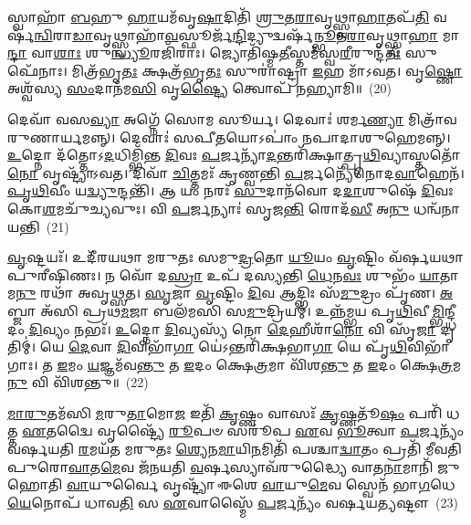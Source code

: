 𑌸𑍍𑌵𑌾𑌹𑌾᳴ \ul{𑌬}\-𑌹𑍁 \ul{𑌹𑌾}\-𑌯𑌮᳴𑌵𑍃\-\ul{𑌷𑌾}\-𑌦𑌿𑌤𑌿᳴ \ul{𑌶𑍍𑌰𑍁}\-𑌤\-\ul{𑌰𑌾}\-𑌵𑍃𑌥𑍍𑌸𑍍𑌵𑌾\-\ul{𑌹𑌾}\-𑌤𑌪᳴\-\ul{𑌤𑌿} 𑌵𑌰𑍍\mbox{}𑌷᳴\-\ul{𑌨𑍍𑌵𑌿}\-𑌰𑌾\-\ul{𑌡𑌾}\-𑌵𑍃𑌥𑍍𑌸𑍍𑌵𑌾𑌹𑌾᳴\-\ul{𑌵}\-𑌸𑍍𑌫𑍂𑌰𑍍𑌜᳴\-\ul{𑌨𑍍𑌦𑌿}\-𑌦𑍍𑌯𑍁𑌦𑍍𑌵𑌰𑍍\mbox{}𑌷᳴\-\ul{𑌨𑍍𑌭𑍂}\-𑌤\-\ul{𑌰𑌾}\-𑌵𑍃𑌥𑍍𑌸𑍍𑌵𑌾\-\ul{𑌹𑌾} 𑌮𑌾\-\ul{𑌨𑍍𑌦𑌾} 𑌵𑌾\-\ul{𑌶𑌾𑌃} 𑌶𑍁\-\ul{𑌨𑍍𑌧𑍍𑌯𑍂}\-𑌰𑌜𑌿᳴𑌰𑌾𑌃। 𑌜𑍍𑌯𑍋𑌤𑌿᳴𑌷𑍍𑌮\-\ul{𑌤𑍀}\-𑌸𑍍𑌤𑌮᳴𑌸𑍍𑌵\-\ul{𑌰𑍀}\-𑌰𑍁𑌨𑍍𑌦᳴\-\ul{𑌤𑍀𑌃} 𑌸𑍁𑌫𑍇᳴𑌨𑌾𑌃। 𑌮𑌿𑌤𑍍𑌰᳴𑌭𑍃\-\ul{𑌤𑌃} 𑌕𑍍𑌷𑌤𑍍𑌰᳴𑌭𑍃\-\ul{𑌤𑌃} 𑌸𑍁𑌰𑌾॑𑌷𑍍𑌟𑍍𑌰𑌾 \ul{𑌇}\-𑌹 𑌮𑌾᳴\-𑌽𑌵𑌤। 𑌵𑍃\-\ul{𑌷𑍍𑌣𑍋} 𑌅𑌶𑍍𑌵᳴𑌸𑍍𑌯 \ul{𑌸𑌂}\-𑌦𑌾𑌨᳴𑌮\-\ul{𑌸𑌿} 𑌵𑍃\-\ul{𑌷𑍍𑌟𑍍𑌯𑍈} 𑌤𑍍𑌵𑍋𑌪᳴ 𑌨𑌹𑍍𑌯𑌾𑌮𑌿॥~(20)

{\anuvakamend[{\-\ul{𑌪𑍂}\-𑌰𑍍𑌤𑌿\-\ul{𑌰𑌾}\-𑌵𑍃𑌦𑍍𑌦𑍍𑌵𑌿𑌚᳴𑌤𑍍𑌵𑌾𑌰𑌿𑍞𑌶𑌚𑍍𑌚}]}%

𑌦𑍇𑌵𑌾᳴ 𑌵𑌸\-\ul{𑌵𑍍𑌯𑌾} 𑌅𑌗𑍍𑌨𑍇᳴ 𑌸𑍋𑌮 𑌸𑍂𑌰𑍍𑌯। 𑌦𑍇𑌵𑌾𑌃॑ 𑌶𑌰𑍍𑌮\-\ul{𑌣𑍍𑌯𑌾} 𑌮𑌿𑌤𑍍𑌰𑌾᳴𑌵𑌰𑍁𑌣𑌾𑌰𑍍𑌯𑌮𑌨𑍍𑌨𑍍। 𑌦𑍇𑌵𑌾𑌃॑ 𑌸𑌪𑍀\-\ul{𑌤}\-𑌯𑍋\-𑌽𑌪𑌾𑌂॑ 𑌨𑌪𑌾𑌦𑌾𑌶𑍁𑌹𑍇𑌮𑌨𑍍𑌨𑍍। \ul{𑌉}\-𑌦𑍍𑌨𑍋 𑌦᳴𑌤𑍍𑌤𑍋\-𑌽\-\ul{𑌦}\-𑌧𑌿𑌮𑍍𑌭𑌿᳴𑌨𑍍𑌤 \ul{𑌦𑌿}\-𑌵𑌃 \ul{𑌪}\-𑌰𑍍𑌜𑌨𑍍𑌯𑌾᳴\-\ul{𑌦}\-𑌨𑍍𑌤𑌰𑌿᳴𑌕𑍍𑌷𑌾𑌤𑍍𑌪𑍃\-\ul{𑌥𑌿}\-𑌵𑍍𑌯𑌾𑌸𑍍𑌤𑌤𑍋᳴ \ul{𑌨𑍋} 𑌵𑍃𑌷𑍍𑌟𑍍𑌯𑌾᳴\-𑌽𑌵𑌤। 𑌦𑌿𑌵𑌾᳴ \ul{𑌚𑌿}\-𑌤𑍍𑌤𑌮𑌃᳴ 𑌕𑍃𑌣𑍍𑌵𑌨𑍍𑌤𑌿 \ul{𑌪}\-𑌰𑍍𑌜𑌨𑍍𑌯𑍇᳴𑌨𑍋𑌦\-\ul{𑌵𑌾}\-𑌹𑍇𑌨᳴। \ul{𑌪𑍃}\-\-\ul{𑌥𑌿}\-𑌵𑍀𑌂 𑌯\-\ul{𑌦𑍍𑌵𑍍𑌯𑍁}\-𑌨𑍍𑌦𑌨𑍍𑌤𑌿᳴। 𑌆 𑌯𑌂 𑌨𑌰𑌃᳴ \ul{𑌸𑍁}\-𑌦𑌾𑌨᳴𑌵𑍋 𑌦\-\ul{𑌦𑌾}\-𑌶𑍁𑌷𑍇᳴ \ul{𑌦𑌿}\-𑌵𑌃 𑌕𑍋\-\ul{𑌶}\-𑌮𑌚𑍁᳴𑌚𑍍𑌯𑌵𑍁𑌃। 𑌵𑌿 \ul{𑌪}\-𑌰𑍍𑌜𑌨𑍍𑌯𑌾𑌃॑ 𑌸𑍃𑌜\-\ul{𑌨𑍍𑌤𑌿} 𑌰𑍋𑌦᳴\-\ul{𑌸𑍀} 𑌅\-\ul{𑌨𑍁} 𑌧𑌨𑍍𑌵᳴𑌨𑌾 𑌯𑌨𑍍𑌤𑌿~(21)

\-\ul{𑌵𑍃}\-𑌷𑍍𑌟𑌯𑌃᳴। 𑌉𑌦𑍀᳴𑌰𑌯𑌥𑌾 𑌮𑌰𑍁𑌤𑌃 𑌸𑌮𑍁\-\ul{𑌦𑍍𑌰}\-𑌤𑍋 \ul{𑌯𑍂}\-𑌯𑌂 \ul{𑌵𑍃}\-𑌷𑍍𑌟𑌿𑌂 𑌵᳴𑌰𑍍\mbox{}𑌷𑌯𑌥𑌾 𑌪𑍁𑌰𑍀𑌷𑌿𑌣𑌃। 𑌨 𑌵𑍋᳴ 𑌦\-\ul{𑌸𑍍𑌰𑌾} 𑌉𑌪᳴ 𑌦𑌸𑍍𑌯𑌨𑍍𑌤𑌿 \ul{𑌧𑍇}\-𑌨\-\ul{𑌵𑌃} 𑌶𑍁𑌭𑌂᳴ \ul{𑌯𑌾}\-𑌤𑌾𑌮\-\ul{𑌨𑍁} 𑌰𑌥𑌾᳴ 𑌅𑌵𑍃𑌥𑍍𑌸𑌤। \ul{𑌸𑍃}\-𑌜𑌾 \ul{𑌵𑍃}\-𑌷𑍍𑌟𑌿𑌂 \ul{𑌦𑌿}\-𑌵 𑌆𑌦𑍍𑌭𑌿𑌃 𑌸᳴\-\ul{𑌮𑍁}\-𑌦𑍍𑌰𑌂 𑌪𑍃᳴𑌣। \ul{𑌅}\-𑌬𑍍𑌜𑌾 𑌅᳴𑌸𑌿 𑌪𑍍𑌰𑌥\-\ul{𑌮}\-𑌜𑌾 𑌬𑌲᳴𑌮𑌸𑌿 𑌸\-\ul{𑌮𑍁}\-𑌦𑍍𑌰𑌿𑌯𑌮𑍍॑। 𑌉𑌨𑍍𑌨᳴𑌮𑍍𑌭𑌯 𑌪𑍃\-\ul{𑌥𑌿}\-𑌵𑍀\-\ul{𑌮𑍍𑌭𑌿}\-𑌨𑍍𑌦𑍍𑌧𑍀𑌦𑌂 \ul{𑌦𑌿}\-𑌵𑍍𑌯𑌂 𑌨𑌭𑌃᳴। \ul{𑌉}\-𑌦𑍍𑌨𑍋 \ul{𑌦𑌿}\-𑌵𑍍𑌯𑌸𑍍𑌯᳴ 𑌨𑍋 \ul{𑌦𑍇}\-𑌹𑍀𑌶𑌾᳴\-\ul{𑌨𑍋} 𑌵𑌿 𑌸𑍃᳴\-\ul{𑌜𑌾} 𑌦𑍃𑌤𑌿𑌮𑍍॑। 𑌯𑍇 \ul{𑌦𑍇}\-𑌵𑌾 \ul{𑌦𑌿}\-𑌵𑌿𑌭𑌾᳴\-\ul{𑌗𑌾} 𑌯𑍇॑\-𑌽𑌨𑍍𑌤𑌰𑌿᳴𑌕𑍍𑌷𑌭𑌾\-\ul{𑌗𑌾} 𑌯𑍇 𑌪𑍃᳴\-\ul{𑌥𑌿}\-𑌵𑌿𑌭𑌾᳴𑌗𑌾𑌃। 𑌤 \ul{𑌇}\-𑌮𑌂 \ul{𑌯}\-𑌜𑍍𑌞𑌮᳴𑌵\-\ul{𑌨𑍍𑌤𑍁} 𑌤 \ul{𑌇}\-𑌦𑌂 𑌕𑍍𑌷𑍇\-\ul{𑌤𑍍𑌰}\-𑌮𑌾 𑌵𑌿᳴𑌶\-\ul{𑌨𑍍𑌤𑍁} 𑌤 \ul{𑌇}\-𑌦𑌂 𑌕𑍍𑌷𑍇\-\ul{𑌤𑍍𑌰}\-𑌮\-\ul{𑌨𑍁} 𑌵𑌿 𑌵𑌿᳴𑌶𑌨𑍍𑌤𑍁॥~(22)

{\anuvakamend[{\-\ul{𑌯}\-\-\ul{𑌨𑍍𑌤𑌿} \ul{𑌦𑍇}\-𑌵𑌾 𑌵𑌿𑍞᳴𑌶\-\ul{𑌤𑌿}\-𑌶𑍍𑌚᳴}]}%

\-\ul{𑌮𑌾}\-\-\ul{𑌰𑍁}\-𑌤𑌮᳴𑌸𑌿 \ul{𑌮}\-𑌰𑍁\-\ul{𑌤𑌾}\-𑌮𑍋\-\ul{𑌜} 𑌇𑌤𑌿᳴ \ul{𑌕𑍃}\-𑌷𑍍𑌣𑌂 𑌵𑌾𑌸𑌃᳴ \ul{𑌕𑍃}\-𑌷𑍍𑌣𑌤𑍂᳴\-\ul{𑌷𑌂} 𑌪𑌰𑌿᳴ 𑌧𑌤𑍍𑌤 \ul{𑌏}\-𑌤𑌦𑍍𑌵𑍈 𑌵𑍃𑌷𑍍𑌟𑍍𑌯𑍈᳴ \ul{𑌰𑍂}\-𑌪𑍞 𑌸𑌰𑍂᳴𑌪 \ul{𑌏}\-𑌵 \ul{𑌭𑍂}\-𑌤𑍍𑌵𑌾 \ul{𑌪}\-𑌰𑍍𑌜𑌨𑍍𑌯𑌂᳴ 𑌵𑌰𑍍\mbox{}𑌷𑌯𑌤𑌿 \ul{𑌰}\-𑌮𑌯᳴𑌤 𑌮𑌰𑍁𑌤𑌃 \ul{𑌶𑍍𑌯𑍇}\-𑌨\-\ul{𑌮𑌾}\-𑌯𑌿\-\ul{𑌨}\-𑌮𑌿𑌤𑌿᳴ 𑌪𑌶𑍍𑌚𑌾\-\ul{𑌦𑍍𑌵𑌾}\-𑌤𑌂 𑌪𑍍𑌰𑌤𑌿᳴ 𑌮𑍀𑌵𑌤𑌿 𑌪𑍁𑌰𑍋\-\ul{𑌵𑌾}\-𑌤\-\ul{𑌮𑍇}\-𑌵 𑌜᳴𑌨𑌯𑌤𑌿 \ul{𑌵}\-𑌰𑍍\mbox{}𑌷𑌸𑍍𑌯𑌾𑌵᳴𑌰𑍁𑌦𑍍𑌧𑍍𑌯𑍈 𑌵𑌾𑌤\-\ul{𑌨𑌾}\-𑌮𑌾𑌨𑌿᳴ 𑌜𑍁𑌹𑍋𑌤𑌿 \ul{𑌵𑌾}\-𑌯𑍁𑌰𑍍𑌵𑍈 𑌵𑍃𑌷𑍍𑌟𑍍𑌯𑌾᳴ 𑌈𑌶𑍇 \ul{𑌵𑌾}\-𑌯𑍁\-\ul{𑌮𑍇}\-𑌵 𑌸𑍍𑌵𑍇𑌨᳴ 𑌭𑌾\-\ul{𑌗}\-𑌧𑍇\-\ul{𑌯𑍇}\-𑌨𑍋𑌪᳴ 𑌧𑌾𑌵\-\ul{𑌤𑌿} 𑌸 \ul{𑌏}\-𑌵𑌾𑌸𑍍𑌮𑍈᳴ \ul{𑌪}\-𑌰𑍍𑌜𑌨𑍍𑌯𑌂᳴ 𑌵𑌰𑍍\mbox{}𑌷𑌯\-\ul{𑌤𑍍𑌯}\-𑌷𑍍𑌟𑍗~(23)

